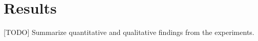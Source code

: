 \section{Results}
\label{sec:results}

[TODO] Summarize quantitative and qualitative findings from the experiments.
